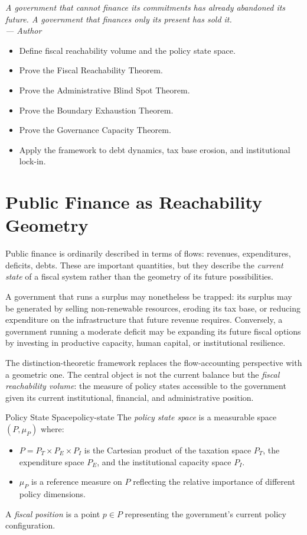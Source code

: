 \documentclass[12pt,twoside,openright]{book}
\newenvironment{epigraph}[2]{%
  \vspace{1em}\begin{flushright}
  \begin{minipage}{0.72\textwidth}
  \itshape\small #1\\[0.4em]
  \upshape\footnotesize\sffamily\color{DistGray}--- #2
  \end{minipage}\end{flushright}\vspace{1.5em}}{}
\newenvironment{objectives}{%
  \begin{tcolorbox}[colback=DistBlue!5,colframe=DistBlue,
    title={\faCheckCircle\enspace Learning Objectives},
    fonttitle=\sffamily\bfseries\color{white},
    attach boxed title to top left={yshift=-2mm,xshift=4mm},
    boxed title style={colback=DistBlue},breakable]
  \begin{itemize}[leftmargin=*,nosep]}{%
  \end{itemize}\end{tcolorbox}\vspace{1em}}
\begin{document}
\begin{epigraph}{%
  A government that cannot finance its commitments
  has already abandoned its future.
  A government that finances only its present
  has sold it.}%
  {Author}
\end{epigraph}

\begin{objectives}
  \item Define fiscal reachability volume and the policy
        state space.
  \item Prove the Fiscal Reachability Theorem.
  \item Prove the Administrative Blind Spot Theorem.
  \item Prove the Boundary Exhaustion Theorem.
  \item Prove the Governance Capacity Theorem.
  \item Apply the framework to debt dynamics, tax base
        erosion, and institutional lock-in.
\end{objectives}

\section{Public Finance as Reachability Geometry}

Public finance is ordinarily described in terms of
flows: revenues, expenditures, deficits, debts.
These are important quantities, but they describe the
\emph{current state} of a fiscal system rather than the
geometry of its future possibilities.

A government that runs a surplus may nonetheless be
trapped: its surplus may be generated by selling
non-renewable resources, eroding its tax base, or
reducing expenditure on the infrastructure that future
revenue requires. Conversely, a government running a
moderate deficit may be expanding its future fiscal
options by investing in productive capacity, human
capital, or institutional resilience.

The distinction-theoretic framework replaces the
flow-accounting perspective with a geometric one. The
central object is not the current balance but the
\emph{fiscal reachability volume}: the measure of policy
states accessible to the government given its current
institutional, financial, and administrative position.

\begin{definition}{Policy State Space}{policy-state}
  The \emph{policy state space} is a measurable space
  $(P, \mu_P)$ where:
  \begin{itemize}[nosep]
    \item $P = P_T \times P_E \times P_I$ is the
          Cartesian product of the taxation space $P_T$,
          the expenditure space $P_E$, and the
          institutional capacity space $P_I$.
    \item $\mu_P$ is a reference measure on $P$
          reflecting the relative importance of
          different policy dimensions.
  \end{itemize}
  A \emph{fiscal position} is a point $p \in P$
  representing the government's current policy
  configuration.
\end{definition}
\end{document}
